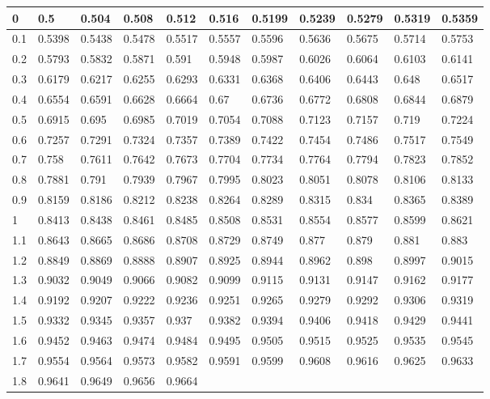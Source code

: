 \documentclass[letterpaper,10pt,english]{sphinxmanual}
\begin{document}
\begin{savenotes}
\begin{longtable}[c]{|l|l|l|l|l|l|l|l|l|l|l|}
0
&
0.5
&
0.504
&
0.508
&
0.512
&
0.516
&
0.5199
&
0.5239
&
0.5279
&
0.5319
&
0.5359
\\
\hline
0.1
&
0.5398
&
0.5438
&
0.5478
&
0.5517
&
0.5557
&
0.5596
&
0.5636
&
0.5675
&
0.5714
&
0.5753
\\
\hline
0.2
&
0.5793
&
0.5832
&
0.5871
&
0.591
&
0.5948
&
0.5987
&
0.6026
&
0.6064
&
0.6103
&
0.6141
\\
\hline
0.3
&
0.6179
&
0.6217
&
0.6255
&
0.6293
&
0.6331
&
0.6368
&
0.6406
&
0.6443
&
0.648
&
0.6517
\\
\hline
0.4
&
0.6554
&
0.6591
&
0.6628
&
0.6664
&
0.67
&
0.6736
&
0.6772
&
0.6808
&
0.6844
&
0.6879
\\
\hline
0.5
&
0.6915
&
0.695
&
0.6985
&
0.7019
&
0.7054
&
0.7088
&
0.7123
&
0.7157
&
0.719
&
0.7224
\\
\hline
0.6
&
0.7257
&
0.7291
&
0.7324
&
0.7357
&
0.7389
&
0.7422
&
0.7454
&
0.7486
&
0.7517
&
0.7549
\\
\hline
0.7
&
0.758
&
0.7611
&
0.7642
&
0.7673
&
0.7704
&
0.7734
&
0.7764
&
0.7794
&
0.7823
&
0.7852
\\
\hline
0.8
&
0.7881
&
0.791
&
0.7939
&
0.7967
&
0.7995
&
0.8023
&
0.8051
&
0.8078
&
0.8106
&
0.8133
\\
\hline
0.9
&
0.8159
&
0.8186
&
0.8212
&
0.8238
&
0.8264
&
0.8289
&
0.8315
&
0.834
&
0.8365
&
0.8389
\\
\hline
1
&
0.8413
&
0.8438
&
0.8461
&
0.8485
&
0.8508
&
0.8531
&
0.8554
&
0.8577
&
0.8599
&
0.8621
\\
\hline
1.1
&
0.8643
&
0.8665
&
0.8686
&
0.8708
&
0.8729
&
0.8749
&
0.877
&
0.879
&
0.881
&
0.883
\\
\hline
1.2
&
0.8849
&
0.8869
&
0.8888
&
0.8907
&
0.8925
&
0.8944
&
0.8962
&
0.898
&
0.8997
&
0.9015
\\
\hline
1.3
&
0.9032
&
0.9049
&
0.9066
&
0.9082
&
0.9099
&
0.9115
&
0.9131
&
0.9147
&
0.9162
&
0.9177
\\
\hline
1.4
&
0.9192
&
0.9207
&
0.9222
&
0.9236
&
0.9251
&
0.9265
&
0.9279
&
0.9292
&
0.9306
&
0.9319
\\
\hline
1.5
&
0.9332
&
0.9345
&
0.9357
&
0.937
&
0.9382
&
0.9394
&
0.9406
&
0.9418
&
0.9429
&
0.9441
\\
\hline
1.6
&
0.9452
&
0.9463
&
0.9474
&
0.9484
&
0.9495
&
0.9505
&
0.9515
&
0.9525
&
0.9535
&
0.9545
\\
\hline
1.7
&
0.9554
&
0.9564
&
0.9573
&
0.9582
&
0.9591
&
0.9599
&
0.9608
&
0.9616
&
0.9625
&
0.9633
\\
\hline
1.8
&
0.9641
&
0.9649
&
0.9656
&
0.9664

\end{longtable}
\end{savenotes}
\end{document}
